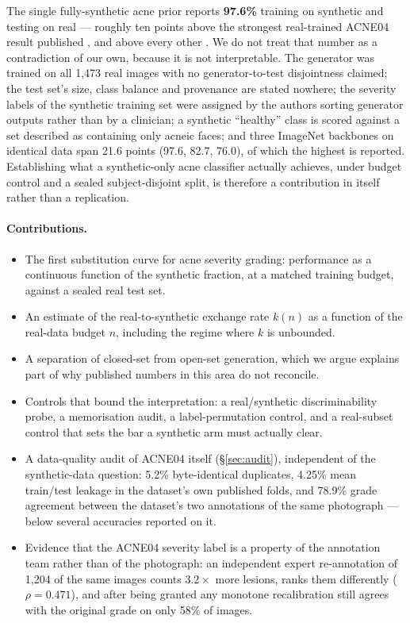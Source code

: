 \documentclass[11pt]{article}
\begin{document}
The single fully-synthetic acne prior reports \textbf{97.6\%} training on synthetic
and testing on real \citep{zein2024} --- roughly ten points above the strongest
real-trained ACNE04 result published \citep{ffpll2025}, and above every other
\citep{wu2019,lds2024,kieglfn2022}. We do not treat that number as a contradiction of
our own, because it is not interpretable. The generator was trained on all 1{,}473
real images with no generator-to-test disjointness claimed; the test set's size,
class balance and provenance are stated nowhere; the severity labels of the synthetic
training set were assigned by the authors sorting generator outputs rather than by a
clinician; a synthetic ``healthy'' class is scored against a set described as
containing only acneic faces; and three ImageNet backbones on identical data span
21.6 points (97.6, 82.7, 76.0), of which the highest is reported. Establishing what a
synthetic-only acne classifier actually achieves, under budget control and a sealed
subject-disjoint split, is therefore a contribution in itself rather than a
replication.

\paragraph{Contributions.}
\begin{itemize}
  \item The first substitution curve for acne severity grading: performance as a
        continuous function of the synthetic fraction, at a matched training budget,
        against a sealed real test set.
  \item An estimate of the real-to-synthetic exchange rate $k(n)$ as a function of
        the real-data budget $n$, including the regime where $k$ is unbounded.
  \item A separation of closed-set from open-set generation, which we argue explains
        part of why published numbers in this area do not reconcile.
  \item Controls that bound the interpretation: a real/synthetic discriminability
        probe, a memorisation audit, a label-permutation control, and a real-subset
        control that sets the bar a synthetic arm must actually clear.
  \item A data-quality audit of ACNE04 itself (\S\ref{sec:audit}), independent of the
        synthetic-data question: 5.2\% byte-identical duplicates, 4.25\% mean
        train/test leakage in the dataset's own published folds, and 78.9\% grade
        agreement between the dataset's two annotations of the same photograph ---
        below several accuracies reported on it.
  \item Evidence that the ACNE04 severity label is a property of the annotation team
        rather than of the photograph: an independent expert re-annotation of 1{,}204 of
        the same images counts $3.2\times$ more lesions, ranks them differently
        ($\rho = 0.471$), and after being granted any monotone recalibration still
        agrees with the original grade on only 58\% of images.
\end{itemize}
\end{document}

